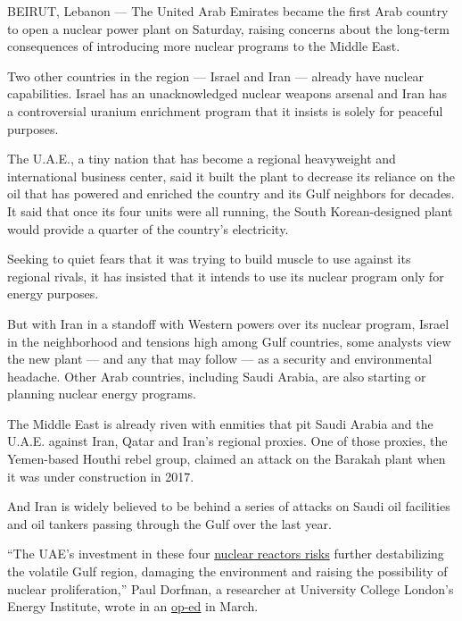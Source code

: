BEIRUT, Lebanon --- The United Arab Emirates became the first Arab
country to open a nuclear power plant on Saturday, raising concerns
about the long-term consequences of introducing more nuclear programs to
the Middle East.

Two other countries in the region --- Israel and Iran --- already have
nuclear capabilities. Israel has an unacknowledged nuclear weapons
arsenal and Iran has a controversial uranium enrichment program that it
insists is solely for peaceful purposes.

The U.A.E., a tiny nation that has become a regional heavyweight and
international business center, said it built the plant to decrease its
reliance on the oil that has powered and enriched the country and its
Gulf neighbors for decades. It said that once its four units were all
running, the South Korean-designed plant would provide a quarter of the
country's electricity.

Seeking to quiet fears that it was trying to build muscle to use against
its regional rivals, it has insisted that it intends to use its nuclear
program only for energy purposes.

But with Iran in a standoff with Western powers over its nuclear
program, Israel in the neighborhood and tensions high among Gulf
countries, some analysts view the new plant --- and any that may follow
--- as a security and environmental headache. Other Arab countries,
including Saudi Arabia, are also starting or planning nuclear energy
programs.

The Middle East is already riven with enmities that pit Saudi Arabia and
the U.A.E. against Iran, Qatar and Iran's regional proxies. One of those
proxies, the Yemen-based Houthi rebel group, claimed an attack on the
Barakah plant when it was under construction in 2017.

And Iran is widely believed to be behind a series of attacks on Saudi
oil facilities and oil tankers passing through the Gulf over the last
year.

``The UAE's investment in these four
\href{https://www.nuclearconsult.com/wp/wp-content/uploads/2019/12/Gulf-Nuclear-Ambition-NCG-Dec-2019.pdf}{nuclear
reactors risks} further destabilizing the volatile Gulf region, damaging
the environment and raising the possibility of nuclear proliferation,''
Paul Dorfman, a researcher at University College London's Energy
Institute, wrote in an
\href{https://www.ucl.ac.uk/news/2020/mar/opinion-why-uae-about-open-four-nuclear-reactors}{op-ed}
in March.

